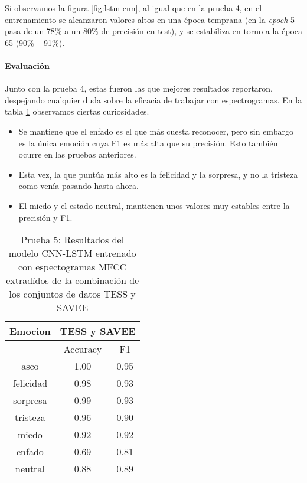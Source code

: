 \documentclass[11pt,a4paper,spanish]{book}
\begin{document}
	Si observamos la figura \ref{fig:lstm-cnn}, al igual que en la prueba 4, en el entrenamiento se alcanzaron valores altos en una época temprana (en la \emph{epoch} 5  pasa de un 78\% a un 80\% de precisión en test), y se estabiliza en torno a la época 65 (90\% ~ 91\%).

	\paragraph{Evaluación}
	Junto con la prueba 4, estas fueron las que mejores resultados reportaron, despejando cualquier duda sobre la eficacia de trabajar con espectrogramas. En la tabla \ref{result_Test5} observamos ciertas curiosidades.
	\begin{itemize}
		\item Se mantiene que el enfado es el que más cuesta reconocer, pero sin embargo es la única emoción cuya F1 es más alta que su precisión. Esto también ocurre en las pruebas anteriores.
		
		\item Esta vez, la que puntúa más alto es la felicidad y la sorpresa, y no la tristeza como venía pasando hasta ahora.
		
		\item El miedo y el estado neutral, mantienen unos valores muy estables entre la precisión y F1.
	\end{itemize}
	
	\begin{table}[H]
		\centering
		\begin{center}
			\begin{tabular}{| c|| c c | }
				\hline
				\multicolumn{1}{|c||}{Emocion} & 
				\multicolumn{2}{|c|}{TESS y SAVEE} \\
				\hline
				& 
				\multicolumn{1}{|c|}{Accuracy}&\multicolumn{1}{|c|}{F1}\\
				\hline
				asco 		& 1.00 & 0.95 \\
				felicidad 	& 0.98 & 0.93 \\
				sorpresa 	& 0.99 & 0.93 \\
				tristeza 	& 0.96 & 0.90 \\
				miedo 		& 0.92 & 0.92\\
				enfado 		& 0.69  & 0.81 \\
				neutral 	& 0.88 & 0.89\\
				\hline
			\end{tabular}
			
			\caption{Prueba 5: Resultados del modelo CNN-LSTM entrenado con espectogramas MFCC extradídos de la combinación de los conjuntos de datos TESS y SAVEE}
			\label{result_Test5}
		\end{center}
	\end{table}
	
\end{document}
